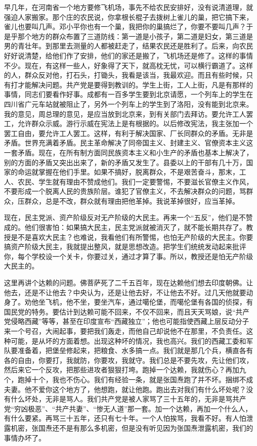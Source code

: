 早几年，在河南省一个地方要修飞机场，事先不给农民安排好，没有说清道理，就强迫人家搬家。那个庄的农民说，你拿根长棍子去拨树上雀儿的巢，把它搞下来，雀儿也要叫几声。邓小平你也有一个巢，我把你的巢搞烂了，你要不要叫几声？于是乎那个地方的群众布置了三道防线：第一道是小孩子，第二道是妇女，第三道是男的青壮年。到那里去测量的人都被赶走了，结果农民还是胜利了。后来，向农民好好说清楚，给他们作了安排，他们的家还是搬了，飞机场还是修了。这样的事情不少。现在，有这样一些人，好象得了天下，就高枕无忧，可以横行霸道了。这样的人，群众反对他，打石头，打锄头，我看是该当，我最欢迎。而且有些时候，只有打才能解决问题。共产党是要得到教训的。学生上街，工人上街，凡是有那样的事情，同志们要看作好事。成都有一百多学生要到北京请愿，一个列车上的学生在四川省广元车站就被阻止了，另外一个列车上的学生到了洛阳，没有能到北京来。我的意见，周总理的意见，是应当放到北京来，到有关部门去拜访。要允许工人罢工，允许群众示威。游行示威在宪法上是有根据的。以后修改宪法，我主张加一个罢工自由，要允许工人罢工。这样，有利于解决国家、厂长同群众的矛盾。无非是矛盾。世界充满着矛盾。民主革命解决了同帝国主义、封建主义、官僚资本主义这一套矛盾。现在，在所有制方面同民族资本主义和小生产的矛盾也基本上解决了，别的方面的矛盾又突出出来了，新的矛盾又发生了。县委以上的干部有几十万，国家的命运就掌握在他们手里。如果不搞好，脱离群众，不是艰苦奋斗，那末，工人、农民、学生就有理由不赞成他们。我们一定要警惕，不要滋长官僚主义作风，不要形成一个脱离人民的贵族阶层。谁犯了官僚主义，不去解决群众的问题，骂群众，压群众，总是不改，群众就有理由把他革掉。我说革掉很好，应当革掉。

现在，民主党派、资产阶级反对无产阶级的大民主。再来一个“五反”，他们是不赞成的。他们很害怕：如果搞大民主，民主党派就被消灭了，就不能长期共存了。教授是不是喜欢大民主？也难说，我看他们有所警惕，也怕无产阶级的大民主。你要搞资产阶级大民主，我就提出整风，就是思想改造。把学生们统统发动起来批评你，每个学校设一个关卡，你要过关，通过才算了事。所以，教授还是怕无产阶级大民主的。

这里再讲个达赖的问题。佛菩萨死了二千五百年，现在达赖他们想去印度朝佛。让他去，还是不让他去？中央认为，还是让他去好，不让他去不好。过几天他就要动身了。劝他坐飞机，他不坐，要坐汽车，通过噶伦堡，而噶伦堡有各国的侦探，有国民党的特务。要估计到达赖可能不回来，不仅不回来，而且天天骂娘，说“共产党侵略西藏”等等，甚至在印度宣布“西藏独立”；他也可能指使西藏上层反动分子来一个号召，大闹起事，要把我们轰走，而他自己却说他不在那里，不负责任。这种可能，是从坏的方面着想。出现这种坏的情况，我也高兴。我们的西藏工委和军队要准备着，把堡垒修起来，把粮食、水多搞一点。我们就是那几个兵，横直各有各的自由，你要打，我就防，你要攻，我就守。我们总是不要先攻，先让他们攻，然后来它一个反攻，把那些进攻者狠狠打垮。跑掉一个达赖，我就伤心？再加九个，跑掉十个，我也不伤心。我们有经验一条，就是张国焘跑了并不坏。捆绑不成夫妻。他不爱你这个地方了，他想跑，就让他跑。跑出去对我们有什么坏处呢？没有什么坏处，无非是骂人。我们共产党是被人家骂了三十五年的，无非是骂共产党“穷凶极恶”、“共产共妻”、“惨无人道”那一套。加一个达赖，再加一个什么人，有什么要紧。再骂三十五年，还只有七十年。一个人怕挨骂，我看不好。有人怕泄露机密，张国焘还不是有那么多机密，但是没有听见因为张国焘泄露机密，我们的事情办坏了。

